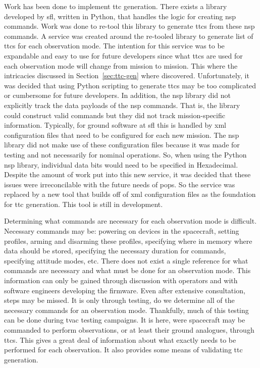 Work has been done to implement \gls{ttc} generation. There exists a library
developed by \gls{sfl}, written in Python, that handles the logic for creating
\gls{nsp} commands. Work was done to re-tool this library to generate
\glspl{ttc} from these \gls{nsp} commands. A service was created around the
re-tooled library to generate list of \glspl{ttc} for each observation mode.
The intention for this service was to be expandable and easy to use for future
developers since what \glspl{ttc} are used for each observation mode will
change from mission to mission. This where the intricacies discussed in
Section~\ref{sec:ttc-gen} where discovered. Unfortunately, it was decided that
using Python scripting to generate \glspl{ttc} may be too complicated or
cumbersome for future developers. In addition, the \gls{nsp} library did not
explicitly track the data payloads of the \gls{nsp} commands. That is, the
library could construct valid commands but they did not track mission-specific
information. Typically, for ground software at \gls{sfl} this is handled by
\gls{xml} configuration files that need to be configured for each new mission.
The \gls{nsp} library did not make use of these configuration files because it
was made for testing and not necessarily for nominal operations. So, when using
the Python \gls{nsp} library, individual data bits would need to be specified
in Hexadecimal. Despite the amount of work put into this new service, it was
decided that these issues were irreconcilable with the future needs of
\gls{pops}. So the service was replaced by a new tool that builds off of
\gls{xml} configuration files as the foundation for \gls{ttc} generation. This
tool is still in development.

Determining what commands are necessary for each observation mode is difficult.
Necessary commands may be: powering on devices in the spacecraft, setting
profiles, arming and disarming these profiles, specifying where in memory where
data should be stored, specifying the necessary duration for commands,
specifying attitude modes, etc.  There does not exist a single reference for
what commands are necessary and what must be done for an observation mode. This
information can only be gained through discussion with operators and with
software engineers developing the firmware.  Even after extensive consultation,
steps may be missed. It is only through testing, do we determine all of the
necessary commands for an observation mode.  Thankfully, much of this testing
can be done during \gls{tvac} testing campaigns. It is here, were spacecraft
may be commanded to perform observations, or at least their ground analogues,
through \glspl{ttc}. This gives a great deal of information about what exactly
needs to be performed for each observation. It also provides some means of
validating \gls{ttc} generation.


